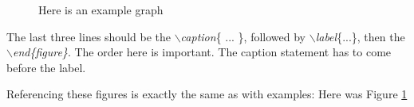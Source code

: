 \documentclass[nooutcomes]{ximera}
\begin{document}
\begin{figure}[!h]
	\begin{image}
	\end{image}
	\caption{Here is an example graph}
	\label{fig:pic}
\end{figure}

The last three lines should be the $\backslash$\emph{caption}\{ ... \}, followed by $\backslash$\emph{label}\{...\}, then the $\backslash$\emph{end\{figure\}}. 
The order here is important. The caption statement has to come before the label.

Referencing these figures is exactly the same as with examples: Here was Figure \ref{fig:pic}
\end{document}
